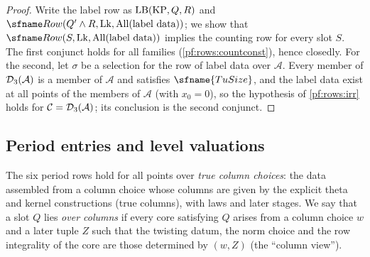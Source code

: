 \begin{proof}
Write the label row as $\mathrm{LB}(\mathrm{KP},Q,R)$ and $\rowsRow(Q'\wedge R,\rowsLk,\rowsAtAll(\text{label data}))$; we
show that $\rowsRow(S,\rowsLk,\rowsAtAll(\text{label data}))$ implies the counting row for every slot $S$. The first
conjunct holds for all families (\cref{pf:rows:countconst}), hence closedly. For the second, let $\sigma$ be a selection
for the row of label data over $\mathcal A$. Every member of $\mathcal{D}_3(\mathcal A)$ is a member of $\mathcal A$ and
satisfies $\sfname{TuSize}$, and the label data exist at all points of the members of $\mathcal A$ (with $x_0=0$), so the
hypothesis of \cref{pf:rows:irr} holds for $\mathcal C=\mathcal{D}_3(\mathcal A)$; its conclusion is the second conjunct.
\end{proof}

\subsection{Period entries and level valuations}\label{sec:pf:rows:periods}

The six period rows hold for all points over \emph{true column choices}: the data assembled from a column choice whose
columns are given by the explicit theta and kernel constructions (true columns), with laws and later stages. We say
that a slot $Q$ lies \emph{over columns} if every core satisfying $Q$ arises from a column choice $w$ and a later tuple
$Z$ such that the twisting datum, the norm choice and the row integrality of the core are those determined by $(w,Z)$
(the ``column view'').

